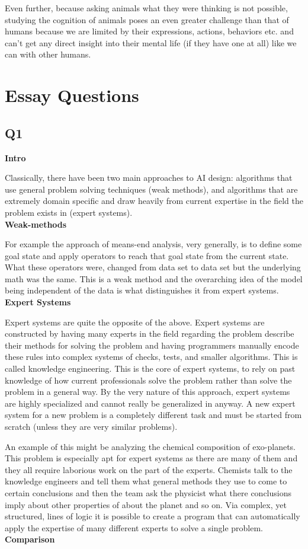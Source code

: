 \documentclass{article}
\begin{document}
Even further, because asking animals what they were thinking is not possible, studying the cognition of animals poses an even greater challenge than that of humans because we are limited by their expressions, actions, behaviors etc. and can't get any direct insight into their mental life (if they have one at all) like we can with other humans.

\section*{Essay Questions}
\subsection*{Q1}
\textbf{Intro}

Classically, there have been two main approaches to AI design: algorithms that use general problem solving techniques (weak methods), and algorithms that are extremely domain specific and draw heavily from current expertise in the field the problem exists in (expert systems).\\
\textbf{Weak-methods}

For example the approach of means-end analysis, very generally, is to define some goal state and apply operators to reach that goal state from the current state. What these operators were, changed from data set to data set but the underlying math was the same. This is a weak method and the overarching idea of the model being independent of the data is what distinguishes it from expert systems.\\
\textbf{Expert Systems}

Expert systems are quite the opposite of the above. Expert systems are constructed by having many experts in the field regarding the problem describe their methods for solving the problem and having programmers manually encode these rules into complex systems of checks, tests, and smaller algorithms. This is called knowledge engineering. This is the core of expert systems, to rely on past knowledge of how current professionals solve the problem rather than solve the problem in a general way. By the very nature of this approach, expert systems are highly specialized and cannot really be generalized in anyway. A new expert system for a new problem is a completely different task and must be started from scratch (unless they are very similar problems).

An example of this might be analyzing the chemical composition of exo-planets. This problem is especially apt for expert systems as there are many of them and they all require laborious work on the part of the experts. Chemists talk to the knowledge engineers and tell them what general methods they use to come to certain conclusions and then the team ask the physicist what there conclusions imply about other properties of about the planet and so on. Via complex, yet structured, lines of logic it is possible to create a program that can automatically apply the expertise of many different experts to solve a single problem.\\
\textbf{Comparison}
\end{document}
